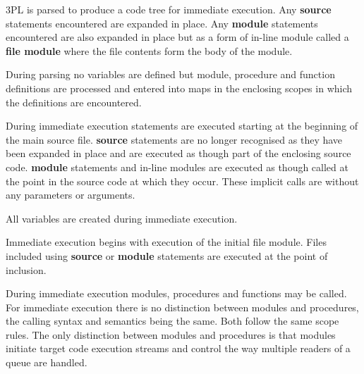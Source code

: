         3PL is parsed to produce a code tree for immediate execution.
        Any {\bf source} statements encountered are expanded in place.
        Any {\bf module} statements encountered are also expanded in place
        but as a form of in-line module called a {\bf file module} where the
        file contents form the body of the module.
        
        During parsing no variables are defined but module, procedure and
        function definitions are processed and entered into maps in the
        enclosing scopes in which the definitions are encountered.
        
        During immediate execution statements are executed starting at the
        beginning of the main source file. {\bf source} statements are no
        longer recognised as they have been expanded in place and are executed
        as though part of the enclosing source code. {\bf module} statements
        and in-line modules are executed as though called at the point in
        the source code at which they occur. These implicit calls are without
        any parameters or arguments.
        
        All variables are created during immediate execution.
    
        Immediate execution begins with execution of the initial file module.
        Files included using {\bf source} or {\bf module} statements are
        executed at the point of inclusion.

        During immediate execution modules, procedures and functions may be
        called. For immediate execution there is no distinction between
        modules and procedures, the calling syntax and semantics being the
        same. Both follow the same scope rules. The only distinction between
        modules and procedures is that modules initiate target code execution
        streams and control the way multiple readers of a queue are handled.

